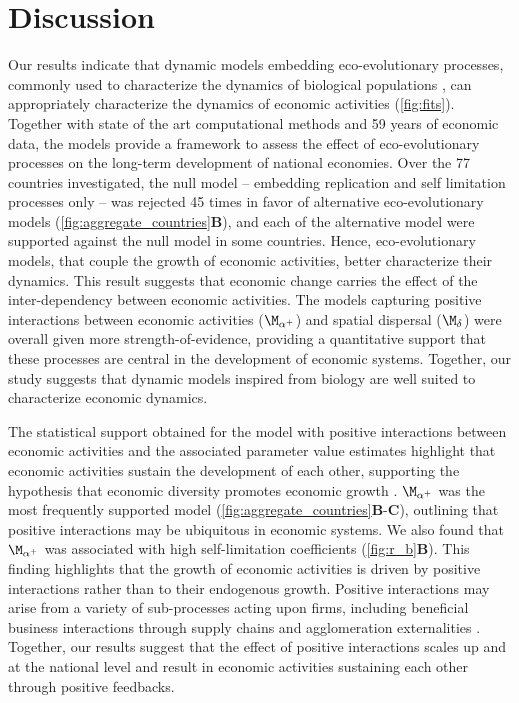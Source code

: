 \section{Discussion}

Our results indicate that dynamic models embedding eco-evolutionary processes, commonly used to characterize the dynamics of biological populations \citep{Bunin2017,Scheffer2006a,Case1990,Tilman1994b,eigen1988molecular}, can appropriately characterize the dynamics of economic activities (\cref{fig:fits}). Together with state of the art computational methods and 59 years of economic data, the models provide a framework to assess the effect of eco-evolutionary processes on the long-term development of national economies.
% 
Over the 77 countries investigated, the null model -- embedding replication and self limitation processes only -- was rejected 45 times in favor of alternative eco-evolutionary models (\cref{fig:aggregate_countries}\textbf{B}), and each of the alternative model were supported against the null model in some countries. Hence, eco-evolutionary models, that couple the growth of economic activities, better characterize their dynamics. This result suggests that economic change carries the effect of the inter-dependency between economic activities. The models capturing positive interactions between economic activities ($\modalphap$) and spatial dispersal ($\moddelta$) were overall given more strength-of-evidence, providing a quantitative support that these processes are central in the development of economic systems.  Together, our study suggests that dynamic models inspired from biology are well suited to characterize economic dynamics. 

The statistical support obtained for the model with positive interactions between economic activities and the associated parameter value estimates highlight that economic activities sustain the development of each other, supporting the hypothesis that economic diversity promotes economic growth \citep{Saviotti2020}. $\modalphap$  was the most frequently supported model (\cref{fig:aggregate_countries}\textbf{B}-\textbf{C}), outlining that positive interactions may be ubiquitous in economic systems. We also found that $\modalphap$ was associated with high self-limitation coefficients (\cref{fig:r_b}\textbf{B}). This finding highlights that the growth of economic activities is driven by positive interactions rather than to their endogenous growth. 
% 
% 
Positive interactions may arise from a variety of sub-processes acting upon firms, including beneficial business interactions through supply chains \citep{Ozman2009,Saavedra2009a} and agglomeration externalities \citep{VanDerPanne2004}. Together, our results suggest that the effect of positive interactions scales up and at the national level and result in economic activities sustaining each other through positive feedbacks. 

